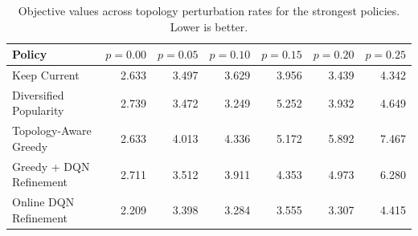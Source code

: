 \begin{table}[t]
\centering
\caption{Objective values across topology perturbation rates for the strongest policies. Lower is better.}
\label{tab:perturbation_results}
\begin{tabular}{lrrrrrr}
\toprule
Policy & $p=0.00$ & $p=0.05$ & $p=0.10$ & $p=0.15$ & $p=0.20$ & $p=0.25$ \\
\midrule
Keep Current & 2.633 & 3.497 & 3.629 & 3.956 & 3.439 & 4.342 \\
Diversified Popularity & 2.739 & 3.472 & 3.249 & 5.252 & 3.932 & 4.649 \\
Topology-Aware Greedy & 2.633 & 4.013 & 4.336 & 5.172 & 5.892 & 7.467 \\
Greedy + DQN Refinement & 2.711 & 3.512 & 3.911 & 4.353 & 4.973 & 6.280 \\
Online DQN Refinement & 2.209 & 3.398 & 3.284 & 3.555 & 3.307 & 4.415 \\
\bottomrule
\end{tabular}
\end{table}

